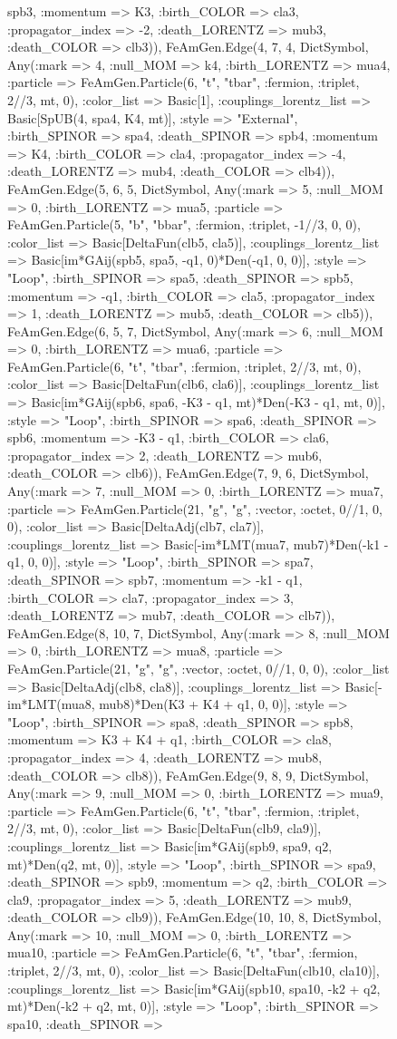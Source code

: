 \documentclass{revtex4}
\begin{document}
\begin{figure}[!htb]
\begin{center}
{spb3, :momentum => K3, :birth_COLOR => cla3, :propagator_index => -2, :death_LORENTZ => mub3, :death_COLOR => clb3)), FeAmGen.Edge(4, 7, 4, Dict{Symbol, Any}(:mark => 4, :null_MOM => k4, :birth_LORENTZ => mua4, :particle => FeAmGen.Particle(6, "t", "tbar", :fermion, :triplet, 2//3, mt, 0), :color_list => Basic[1], :couplings_lorentz_list => Basic[SpUB(4, spa4, K4, mt)], :style => "External", :birth_SPINOR => spa4, :death_SPINOR => spb4, :momentum => K4, :birth_COLOR => cla4, :propagator_index => -4, :death_LORENTZ => mub4, :death_COLOR => clb4)), FeAmGen.Edge(5, 6, 5, Dict{Symbol, Any}(:mark => 5, :null_MOM => 0, :birth_LORENTZ => mua5, :particle => FeAmGen.Particle(5, "b", "bbar", :fermion, :triplet, -1//3, 0, 0), :color_list => Basic[DeltaFun(clb5, cla5)], :couplings_lorentz_list => Basic[im*GAij(spb5, spa5, -q1, 0)*Den(-q1, 0, 0)], :style => "Loop", :birth_SPINOR => spa5, :death_SPINOR => spb5, :momentum => -q1, :birth_COLOR => cla5, :propagator_index => 1, :death_LORENTZ => mub5, :death_COLOR => clb5)), FeAmGen.Edge(6, 5, 7, Dict{Symbol, Any}(:mark => 6, :null_MOM => 0, :birth_LORENTZ => mua6, :particle => FeAmGen.Particle(6, "t", "tbar", :fermion, :triplet, 2//3, mt, 0), :color_list => Basic[DeltaFun(clb6, cla6)], :couplings_lorentz_list => Basic[im*GAij(spb6, spa6, -K3 - q1, mt)*Den(-K3 - q1, mt, 0)], :style => "Loop", :birth_SPINOR => spa6, :death_SPINOR => spb6, :momentum => -K3 - q1, :birth_COLOR => cla6, :propagator_index => 2, :death_LORENTZ => mub6, :death_COLOR => clb6)), FeAmGen.Edge(7, 9, 6, Dict{Symbol, Any}(:mark => 7, :null_MOM => 0, :birth_LORENTZ => mua7, :particle => FeAmGen.Particle(21, "g", "g", :vector, :octet, 0//1, 0, 0), :color_list => Basic[DeltaAdj(clb7, cla7)], :couplings_lorentz_list => Basic[-im*LMT(mua7, mub7)*Den(-k1 - q1, 0, 0)], :style => "Loop", :birth_SPINOR => spa7, :death_SPINOR => spb7, :momentum => -k1 - q1, :birth_COLOR => cla7, :propagator_index => 3, :death_LORENTZ => mub7, :death_COLOR => clb7)), FeAmGen.Edge(8, 10, 7, Dict{Symbol, Any}(:mark => 8, :null_MOM => 0, :birth_LORENTZ => mua8, :particle => FeAmGen.Particle(21, "g", "g", :vector, :octet, 0//1, 0, 0), :color_list => Basic[DeltaAdj(clb8, cla8)], :couplings_lorentz_list => Basic[-im*LMT(mua8, mub8)*Den(K3 + K4 + q1, 0, 0)], :style => "Loop", :birth_SPINOR => spa8, :death_SPINOR => spb8, :momentum => K3 + K4 + q1, :birth_COLOR => cla8, :propagator_index => 4, :death_LORENTZ => mub8, :death_COLOR => clb8)), FeAmGen.Edge(9, 8, 9, Dict{Symbol, Any}(:mark => 9, :null_MOM => 0, :birth_LORENTZ => mua9, :particle => FeAmGen.Particle(6, "t", "tbar", :fermion, :triplet, 2//3, mt, 0), :color_list => Basic[DeltaFun(clb9, cla9)], :couplings_lorentz_list => Basic[im*GAij(spb9, spa9, q2, mt)*Den(q2, mt, 0)], :style => "Loop", :birth_SPINOR => spa9, :death_SPINOR => spb9, :momentum => q2, :birth_COLOR => cla9, :propagator_index => 5, :death_LORENTZ => mub9, :death_COLOR => clb9)), FeAmGen.Edge(10, 10, 8, Dict{Symbol, Any}(:mark => 10, :null_MOM => 0, :birth_LORENTZ => mua10, :particle => FeAmGen.Particle(6, "t", "tbar", :fermion, :triplet, 2//3, mt, 0), :color_list => Basic[DeltaFun(clb10, cla10)], :couplings_lorentz_list => Basic[im*GAij(spb10, spa10, -k2 + q2, mt)*Den(-k2 + q2, mt, 0)], :style => "Loop", :birth_SPINOR => spa10, :death_SPINOR => }
\end{center}
\end{figure}
\end{document}
